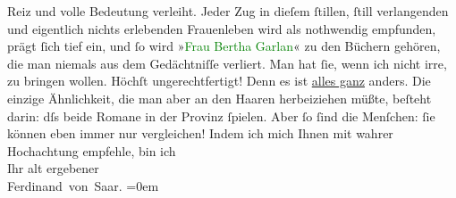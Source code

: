                Reiz und volle Bedeu{\pb}tung verleiht. Jeder Zug in dieſem ſtillen, ſtill
               verlangenden und eigentlich nichts erlebenden Frauenleben wird als nothwendig
               empfunden, prägt ſich tief ein, und ſo wird »\textcolor{green}{Frau Bertha
                  Garlan}{}\ledrightnote{\textcolor{green}{Frau Bertha Garlan. Roman}}« zu den Büchern gehören, die man niemals aus dem Gedächtniſſe
               verliert. Man hat ſie, wenn ich nicht irre, zu \label{K_L01130_1v}\label{K_L01130_1h} bringen wollen. Höchſt
               ungerechtfertigt! Denn es ist \uline{alles ganz} anders. Die
               einzige Ähnlichkeit, die man aber an den Haaren herbeiziehen müßte, beſteht darin:
               dſs beide Romane in der Provinz ſpielen. Aber ſo ſind die Menſchen: ſie können eben
               immer nur vergleichen! \pend
           \pstart
           Indem ich mich Ihnen mit wahrer Hochachtung empfehle, bin ich{\\[\baselineskip]}Ihr alt ergebener{\\[\baselineskip]}\spacefill\mbox{Ferdinand von Saar.}\pend
           \leftskip=0em{}\endnumbering{}  
      